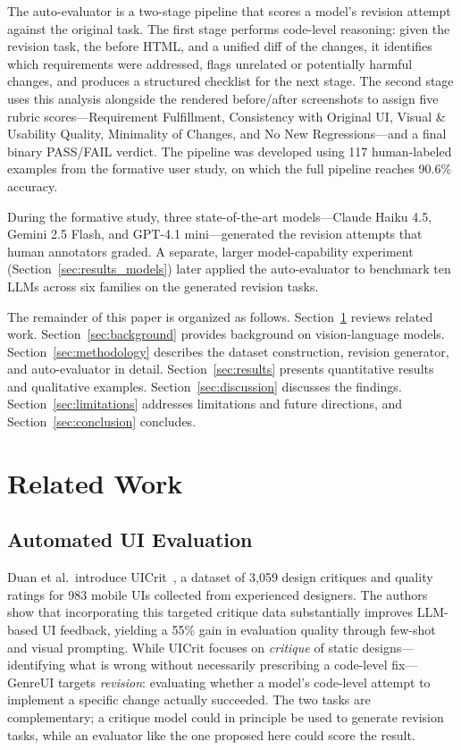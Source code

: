 \documentclass[sigconf,nonacm]{acmart}
\begin{document}
The auto-evaluator is a two-stage pipeline that scores a model's revision attempt against the original task. The first stage performs code-level reasoning: given the revision task, the before HTML, and a unified diff of the changes, it identifies which requirements were addressed, flags unrelated or potentially harmful changes, and produces a structured checklist for the next stage. The second stage uses this analysis alongside the rendered before/after screenshots to assign five rubric scores—Requirement Fulfillment, Consistency with Original UI, Visual \& Usability Quality, Minimality of Changes, and No New Regressions—and a final binary PASS/FAIL verdict. The pipeline was developed using 117 human-labeled examples from the formative user study, on which the full pipeline reaches 90.6\% accuracy.

During the formative study, three state-of-the-art models—Claude Haiku 4.5, Gemini 2.5 Flash, and GPT-4.1 mini—generated the revision attempts that human annotators graded. A separate, larger model-capability experiment (Section~\ref{sec:results_models}) later applied the auto-evaluator to benchmark ten LLMs across six families on the generated revision tasks.

The remainder of this paper is organized as follows. Section~\ref{sec:related} reviews related work. Section~\ref{sec:background} provides background on vision-language models. Section~\ref{sec:methodology} describes the dataset construction, revision generator, and auto-evaluator in detail. Section~\ref{sec:results} presents quantitative results and qualitative examples. Section~\ref{sec:discussion} discusses the findings. Section~\ref{sec:limitations} addresses limitations and future directions, and Section~\ref{sec:conclusion} concludes.

\section{Related Work}
\label{sec:related}

\subsection{Automated UI Evaluation}

Duan et al.\ introduce UICrit~\cite{duan2024uicrit}, a dataset of 3,059 design critiques and quality ratings for 983 mobile UIs collected from experienced designers. The authors show that incorporating this targeted critique data substantially improves LLM-based UI feedback, yielding a 55\% gain in evaluation quality through few-shot and visual prompting. While UICrit focuses on \emph{critique} of static designs—identifying what is wrong without necessarily prescribing a code-level fix—GenreUI targets \emph{revision}: evaluating whether a model's code-level attempt to implement a specific change actually succeeded. The two tasks are complementary; a critique model could in principle be used to generate revision tasks, while an evaluator like the one proposed here could score the result.
\end{document}
